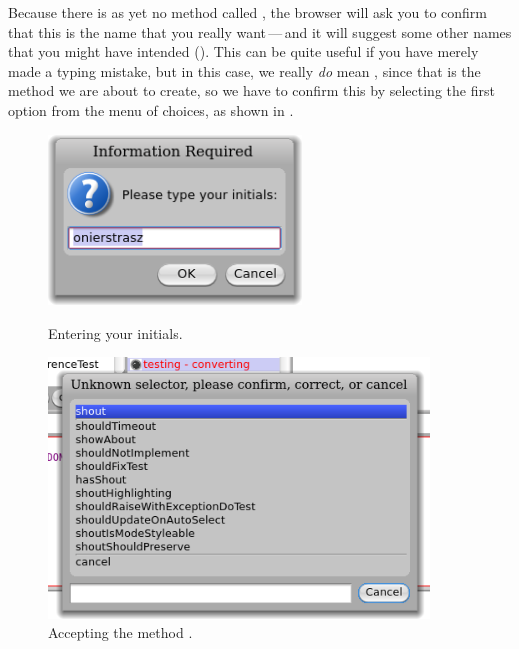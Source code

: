 \documentclass[a4paper,10pt,twoside]{book}
\begin{document}

Because there is as yet no method called , the browser will ask you to confirm that this is the name that you really want\,---\,and it will suggest some other names that you might have intended ().
This can be quite useful if you have merely made a typing mistake, but in this case, we really \emph{do} mean , since that is the method we are about to create, so we have to confirm this by selecting the first option from the menu of choices, as shown in . 


\begin{figure}[htb]
\begin{minipage}[b]{0.48\textwidth}
\centerline {\includegraphics[width=0.6\textwidth]{initials}}
\caption{Entering your initials.\label{fig:initials}}
\end{minipage}
\hfill
\begin{minipage}[b]{0.48\textwidth}
\centerline {\includegraphics[width=0.9\textwidth]{testShoutConfirm}}
\caption{Accepting the  method .\label{fig:testShoutConfirm}}
\end{minipage}
\end{figure}
\end{document}

